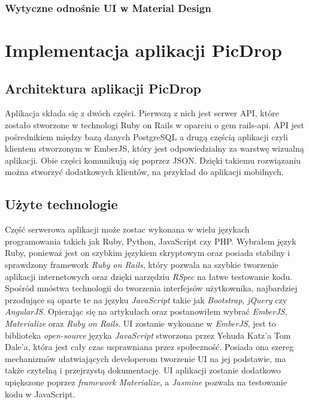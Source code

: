 \documentclass[brudnopis]{xmgr}
\begin{document}
\subsection{Wytyczne odnośnie UI w Material Design}

\chapter{Implementacja aplikacji PicDrop}
\section{Architektura aplikacji PicDrop}

Aplikacja składa się z dwóch części. Pierwszą z nich jest serwer API, które zostało stworzone w technologi Ruby on Rails w oparciu o gem rails-api. API jest pośrednikiem między bazą danych PostgreSQL a drugą częścią aplikacji czyli klientem stworzonym w EmberJS, który jest odpowiedzialny za warstwę wizualną aplikacji. Obie części komunikują się poprzez  JSON. Dzięki takiemu rozwiązaniu można stworzyć dodatkowych klientów, na przykład do aplikacji mobilnych.

\section{Użyte technologie}
Część serwerowa aplikacji może zostac wykonana w wielu językach programowania takich jak Ruby, Python, JavaScript czy PHP.
Wybrałem język Ruby, ponieważ jest on szybkim językiem skryptowym oraz posiada stabilny i sprawdzony framework \textit{Ruby on Rails}, który pozwala na szybkie tworzenie aplikacji internetowych oraz dzięki narzędziu \textit{RSpec} na łatwe testowanie kodu. 
Spośród mnóstwa technologii do tworzenia interfejsów użytkownika, najbardziej przodujące są oparte te na języku \textit{JavaScript} takie jak \textit{Bootstrap},\textit{ jQuery} czy\\ \textit{AngularJS}. Opierając się na artykułach \cite{} oraz \cite{} postanowiłem wybrać \textit{EmberJS}, \textit{Materialize} oraz \textit{Ruby on Rails}. UI zostanie wykonane w \textit{EmberJS}, jest to  biblioteka  \textit{open-source} języka \textit{JavaScript} stworzona  przez  Yehuda Katz'a  Tom Dale'a, która jest cały czas usprawniana przez społeczność. Posiada ona szereg mechanizmów ułatwiających developerom tworzenie UI na jej podstawie, ma także czytelną i przejrzystą dokumentację. UI aplikacji zostanie dodatkowo upiększone poprzez \textit{framework Materialize}, a \textit{Jasmine} pozwala na testowanie kodu w JavaScript.
\end{document}
